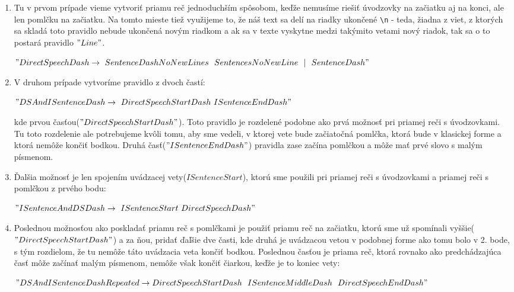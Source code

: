 \documentclass[12pt,a4paper]{report}
\theoremstyle{definition}
\theoremstyle{remark}
\begin{document}
\begin{enumerate}[leftmargin=*]
\item Tu v prvom prípade vieme vytvoriť priamu reč jednoduchším spôsobom, keďže nemusíme riešiť úvodzovky na začiatku aj na konci, ale len pomlčku na začiatku. Na tomto mieste tiež využijeme to, že náš text sa delí na riadky ukončené \verb!\n! - teda, žiadna z viet, z ktorých sa skladá toto pravidlo nebude ukončená novým riadkom a ak sa v texte vyskytne medzi takýmito vetami nový riadok, tak sa o to postará pravidlo $"Line"$.

$"DirectSpeechDash \\ \to \ SentenceDashNoNewLines \ \ SentencesNoNewLine \ \ |  \ \ SentenceDash"$
\item V druhom prípade vytvoríme pravidlo z dvoch častí:

$"DSAndISentenceDash \to \ DirectSpeechStartDash \ ISentenceEndDash"$ 


kde prvou časťou($"DirectSpeechStartDash"$). Toto pravidlo je rozdelené podobne ako prvá možnosť pri priamej reči s úvodzovkami. Tu toto rozdelenie ale potrebujeme kvôli tomu, aby sme vedeli, v ktorej vete bude začiatočná pomlčka, ktorá bude v klasickej forme a ktorá nemôže končiť bodkou. Druhá časť($"ISentenceEndDash"$) pravidla zase začína pomlčkou a môže mať prvé slovo s malým písmenom.
\item Ďalšia možnosť je len spojením uvádzacej vety($ISentenceStart$), ktorú sme použili pri priamej reči s úvodzovkami a priamej reči s pomlčkou z prvého bodu:


$"ISentenceAndDSDash \to \ ISentenceStart \ DirectSpeechDash"$
\item Poslednou možnosťou ako poskladať priamu reč s pomlčkami je použiť priamu reč na začiatku, ktorú sme už spomínali vyššie($"DirectSpeechStartDash"$) a za ňou, pridať ďaľšie dve časti, kde druhá je uvádzacou vetou v podobnej forme ako tomu bolo v 2. bode, s tým rozdielom, že tu nemôže táto uvádzacia veta končiť bodkou. Poslednou časťou je priama reč, ktorá rovnako ako predchádzajúca časť môže začínať malým písmenom, nemôže však končiť čiarkou, keďže je to koniec vety:


$"DSAndISentenceDashRepeated \to 
\\ DirectSpeechStartDash \ \ ISentenceMiddleDash\ \ DirectSpeechEndDash"$


%
%
\end{enumerate} 
\end{document}
